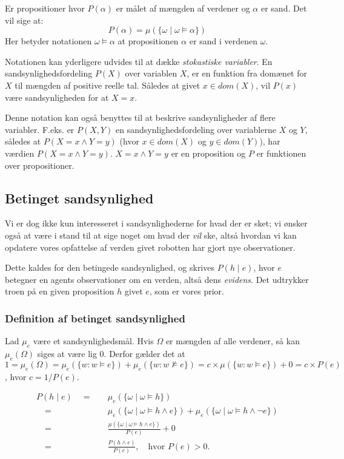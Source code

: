 Er propositioner hvor $P(\alpha)$ er målet af mængden af verdener og $\alpha$ er sand.
Det vil sige at:
$$P(\alpha) = \mu(\{\omega \mid \omega \models \alpha \})$$
Her betyder notationen $\omega \models \alpha$ at propositionen $\alpha$ er sand i verdenen $\omega$.

Notationen kan yderligere udvides til at dække \emph{stokastiske variabler}.
En sandsynlighedsfordeling $P(X)$ over variablen $ X $, er en funktion fra
domænet for $ X $ til mængden af positive reelle tal.
Således at givet $x \in dom(X)$, vil $P(x)$ være sandsynligheden for at $X = x$.

Denne notation kan også benyttes til at beskrive sandsynligheder af flere variabler.
F.eks. er $P(X,Y)$ en sandsynlighedsfordeling over variablerne $ X $ og $ Y $, således at $P(X = x \wedge Y = y)$ (hvor $x \in dom(X)$ og $y \in dom(Y)$), har værdien $P(X = x \wedge Y = y)$.
$X = x \wedge Y = y$ er en proposition og $ P $ er funktionen over propositioner. 


\subsection{Betinget sandsynlighed}
Vi er dog ikke kun interesseret i sandsynlighederne for hvad der er sket; vi ønsker også at være i stand til at sige noget om hvad der \textit{vil} ske, altså hvordan vi kan opdatere vores opfattelse af verden givet robotten har gjort nye observationer.

Dette kaldes for den betingede sandsynlighed, og skrives $P(h \mid e)$, hvor $ e $ betegner en agents observationer om en verden, altså dens \textit{evidens}.
Det udtrykker troen på en given proposition $ h $ givet $ e $, som er vores prior.


\subsubsection{Definition af betinget sandsynlighed}
Lad $\mu_e$ være et sandsynlighedsmål.
Hvis $\Omega$ er mængden af alle verdener, så kan $\mu_e(\Omega)$ siges at være lig 0.
Derfor gælder det at $1 = \mu_e(\Omega) = \mu_e(\{ w : w \models e \}) + \mu_e(\{ w : w \not\models e \}) = c \times \mu(\{ w : w \models e\}) + 0 = c \times P(e)$, hvor $c = 1/P(e)$.

\begin{align*}
P(h \mid e) \quad = \quad & \mu_e(\{\omega \mid \omega \models h \})\\
\quad = \quad & \mu_e(\{\omega \mid \omega \models h \wedge e \}) + \mu_e(\{\omega \mid \omega \models h \wedge \neg e \})\\
\quad = \quad & \frac{\mu(\{\omega \mid \omega \models h \wedge e \})}{P(e)} + 0\\
\quad = \quad & \frac{P(h \wedge e)}{P(e)}, \quad \textrm{hvor $P(e) > 0$.}
\end{align*}


